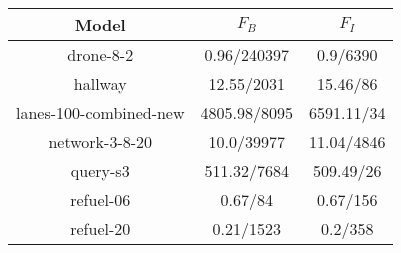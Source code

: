 \documentclass{article}
\begin{document}
\begin{table}
\begin{tabular}{|c|c|c|}
\hline

Model & $F_{B}$ & $F_{I}$ \\ \hline 

drone-8-2 & 0.96/240397 & 0.9/6390 \\
\hline
hallway & 12.55/2031 & 15.46/86 \\
\hline
lanes-100-combined-new & 4805.98/8095 & 6591.11/34 \\
\hline
network-3-8-20 & 10.0/39977 & 11.04/4846 \\
\hline
query-s3 & 511.32/7684 & 509.49/26 \\
\hline
refuel-06 & 0.67/84 & 0.67/156 \\
\hline
refuel-20 & 0.21/1523 & 0.2/358 \\
\hline
\end{tabular}
\end{table}
\end{document}
